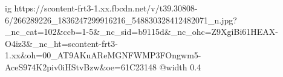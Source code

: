  
 
 
 
 

\ifcmt
  ig https://scontent-frt3-1.xx.fbcdn.net/v/t39.30808-6/266289226_1836247299916216_548830328412482071_n.jpg?_nc_cat=102&ccb=1-5&_nc_sid=b9115d&_nc_ohc=Z9XgiBi61HEAX-O4iz3&_nc_ht=scontent-frt3-1.xx&oh=00_AT9AKuAReMGNFWMP3FOngwm5-AceS974K2piv0iHStvBzw&oe=61C23148
  @width 0.4
\fi
